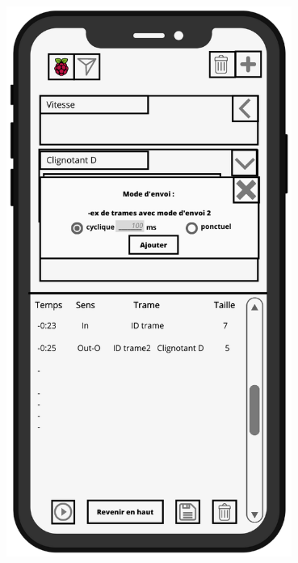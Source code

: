 \begin{minipage}{0.5\linewidth}
    \centering
    \includegraphics[width=0.7\textwidth]{sections/3_Exigences_specifiques/1_IHM/ihm/ecranModeEnvoiTrame.png}
    \captionsetup{justification=centering}
    \label{ecran_mode_envoi_trames}
\end{minipage} \newline 

\vspace{0.5cm}

